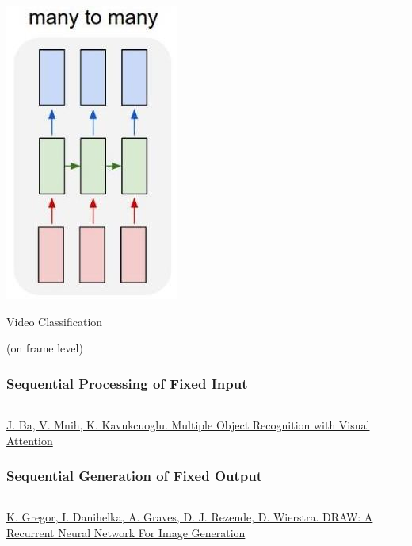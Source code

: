 \documentclass[fullscreen=true, bookmarks=true, hyperref={pdfencoding=unicode}]{beamer}
\begin{document}
\begin{frame}
  \begin{center}
    \includegraphics[keepaspectratio,
                     width=0.3\paperwidth]{many-to-many-2.jpg}

    Video Classification

    (on frame level)
  \end{center}
\end{frame}


\begin{frame}
  \frametitle{Sequential Processing of Fixed Input}
  \begin{center}
  \end{center}

  \noindent\rule{8cm}{0.4pt}

  {\small \href{https://arxiv.org/abs/1412.7755}{J. Ba, V. Mnih, K. Kavukcuoglu. Multiple Object Recognition with Visual Attention}}

\end{frame}



\begin{frame}
  \frametitle{Sequential Generation of Fixed Output}
  \begin{center}
  \end{center}

  \noindent\rule{8cm}{0.4pt}

  {\small \href{https://arxiv.org/abs/1502.04623}{K. Gregor, I. Danihelka, A. Graves, D. J. Rezende, D. Wierstra. DRAW: A Recurrent Neural Network For Image Generation}}

\end{frame}
\end{document}
